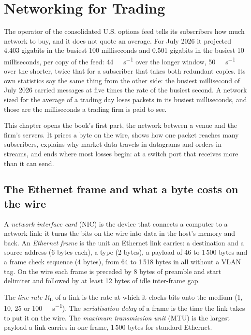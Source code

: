 \chapter{Networking for Trading}\label{ch:nw:networking-for-trading}

The operator of the consolidated U.S. options feed tells its subscribers how much network to buy, and it does not quote an
average. For July 2026 it projected 4.403 gigabits in the busiest 100 milliseconds and 0.501 gigabits in the busiest 10
milliseconds, per copy of the feed: \qty{44}{\giga\bit\per\second} over the longer window, \qty{50}{\giga\bit\per\second}
over the shorter, twice that for a subscriber that takes both redundant copies. Its own statistics say the same thing from the
other side: the busiest millisecond of July 2026 carried messages at five times the rate of the busiest second. A network
sized for the average of a trading day loses packets in its busiest milliseconds, and those are the milliseconds a trading firm
is paid to see.

This chapter opens the book's first part, the network between a venue and the firm's servers. It prices a byte on the wire,
shows how one packet reaches many subscribers, explains why market data travels in datagrams and orders in streams, and ends
where most losses begin: at a switch port that receives more than it can send.

\section{The Ethernet frame and what a byte costs on the wire}

\begin{definition}\label{def:nw:networking-for-trading:frame}
A \emph{network interface card} (NIC) is the device that connects a computer to a network link:
it turns the bits on the wire into data in the host's memory and back. An \emph{Ethernet frame} is the
unit an Ethernet link carries: a destination and a source address (6 bytes each), a type (2 bytes), a payload of 46 to 1\,500
bytes and a frame check sequence (4 bytes), from 64 to 1\,518 bytes in all without a VLAN tag. On the wire each frame is
preceded by 8 bytes of preamble and start delimiter and followed by at least 12 bytes of idle inter-frame gap.
\end{definition}

\begin{definition}\label{def:nw:networking-for-trading:ser}
The \emph{line rate} $R_{\mathrm L}$ of a link is the rate at which it clocks bits onto the medium (1, 10, 25
or \qty{100}{\giga\bit\per\second}). The \emph{serialisation delay} of a frame is the time the link
takes to put it on the wire. The \emph{maximum transmission unit} (MTU) is the largest payload
a link carries in one frame, 1\,500 bytes for standard Ethernet.
\end{definition}

